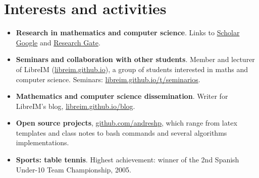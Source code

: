 \documentclass[10pt,a4paper,sans]{moderncv} %
\begin{document}

\vspace*{-2mm}
\section{Interests and activities}
\begin{itemize}
    \item \textbf{Research in mathematics and computer science}. Links to \textcolor{colorl}{\href{https://scholar.google.es/citations?user=oLAt2JsAAAAJ&hl=es}{Scholar Google}} and \textcolor{colorl}{\href{https://www.researchgate.net/profile/Andres_Herrera-Poyatos}{Research Gate}}.
    \item \textbf{Seminars and collaboration with other students}. Member and lecturer of LibreIM (\textcolor{colorl}{\url{libreim.github.io}}), a group of students interested in maths and computer science.
      Seminars: \textcolor{colorl}{\url{libreim.github.io/t/seminarios}}.
    \item \textbf{Mathematics and computer science dissemination}. Writer for LibreIM's blog, \textcolor{colorl}{\url{libreim.github.io/blog}}.
    \item \textbf{Open source projects}, \textcolor{colorl}{\url{github.com/andreshp}}, which range from latex templates and class notes to bash commands and several algorithms implementations.
    \item \textbf{Sports: table tennis}. Highest achievement: winner of the 2nd Spanish Under-10 Team Championship, 2005.
\end{itemize}
\end{document}
